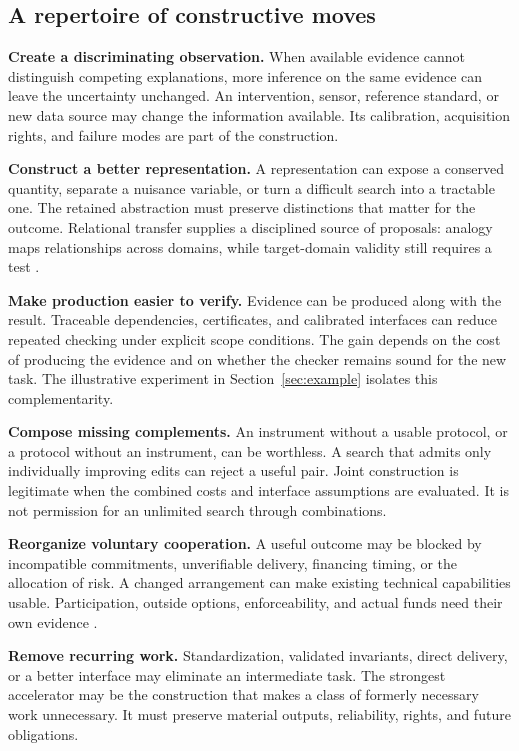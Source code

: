 \documentclass[11pt,letterpaper]{article}
\theoremstyle{remark}\newtheorem{remark}{Remark}[section]
\begin{document}
\subsection{A repertoire of constructive moves}
\textbf{Create a discriminating observation.}
When available evidence cannot distinguish competing explanations, more inference on the same evidence can leave the uncertainty unchanged.
An intervention, sensor, reference standard, or new data source may change the information available.
Its calibration, acquisition rights, and failure modes are part of the construction.

\textbf{Construct a better representation.}
A representation can expose a conserved quantity, separate a nuisance variable, or turn a difficult search into a tractable one.
The retained abstraction must preserve distinctions that matter for the outcome.
Relational transfer supplies a disciplined source of proposals: analogy maps relationships across domains, while target-domain validity still requires a test \citep{gentner1983,gickholyoak1980}.

\textbf{Make production easier to verify.}
Evidence can be produced along with the result.
Traceable dependencies, certificates, and calibrated interfaces can reduce repeated checking under explicit scope conditions.
The gain depends on the cost of producing the evidence and on whether the checker remains sound for the new task.
The illustrative experiment in Section~\ref{sec:example} isolates this complementarity.

\textbf{Compose missing complements.}
An instrument without a usable protocol, or a protocol without an instrument, can be worthless.
A search that admits only individually improving edits can reject a useful pair.
Joint construction is legitimate when the combined costs and interface assumptions are evaluated.
It is not permission for an unlimited search through combinations.

\textbf{Reorganize voluntary cooperation.}
A useful outcome may be blocked by incompatible commitments, unverifiable delivery, financing timing, or the allocation of risk.
A changed arrangement can make existing technical capabilities usable.
Participation, outside options, enforceability, and actual funds need their own evidence \citep{boucher2026economy}.

\textbf{Remove recurring work.}
Standardization, validated invariants, direct delivery, or a better interface may eliminate an intermediate task.
The strongest accelerator may be the construction that makes a class of formerly necessary work unnecessary.
It must preserve material outputs, reliability, rights, and future obligations.
\end{document}
